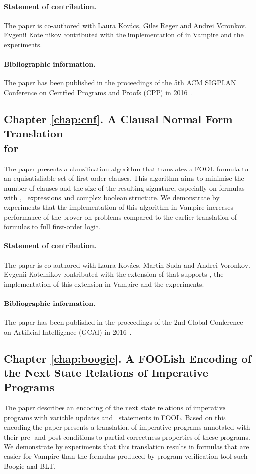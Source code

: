 \paragraph{Statement of contribution.} The paper is co-authored with Laura Kov\'{a}cs, Giles Reger and Andrei Voronkov. Evgenii Kotelnikov contributed with the implementation of \folb{} in Vampire and the experiments.

\paragraph{Bibliographic information.} The paper has been published in the proceedings of the 5th ACM SIGPLAN Conference on Certified Programs and Proofs (CPP) in 2016~\cite{VampireAndFOOL}.

\subsection*{Chapter \ref{chap:cnf}. A Clausal Normal Form Translation\\for \folb{}}
The paper presents a clausification algorithm that translates a FOOL formula to an equisatisfiable set of first-order clauses. This algorithm aims to minimise the number of clauses and the size of the resulting signature, especially on formulas with \ITE, \LETIN\ expressions and complex boolean structure. We demonstrate by experiments that the implementation of this algorithm in Vampire increases performance of the prover on \folb{} problems compared to the earlier translation of \folb{} formulas to full first-order logic.

\paragraph{Statement of contribution.} The paper is co-authored with Laura Kov\'{a}cs, Martin Suda and Andrei Voronkov. Evgenii Kotelnikov contributed with the extension of \newcnf{} that supports \folb{}, the implementation of this extension in Vampire and the experiments.

\paragraph{Bibliographic information.} The paper has been published in the proceedings of the 2nd Global Conference on Artificial Intelligence (GCAI) in 2016~\cite{FOOLCNF}.

\subsection*{Chapter \ref{chap:boogie}. A FOOLish Encoding of the Next State Relations of Imperative Programs}
The paper describes an encoding of the next state relations of imperative programs with variable updates and \ITE\ statements in FOOL. Based on this encoding the paper presents a translation of imperative programs annotated with their pre- and post-conditions to partial correctness properties of these programs. We demonstrate by experiments that this translation results in formulas that are easier for Vampire than the formulas produced by program verification tool such Boogie and BLT.

